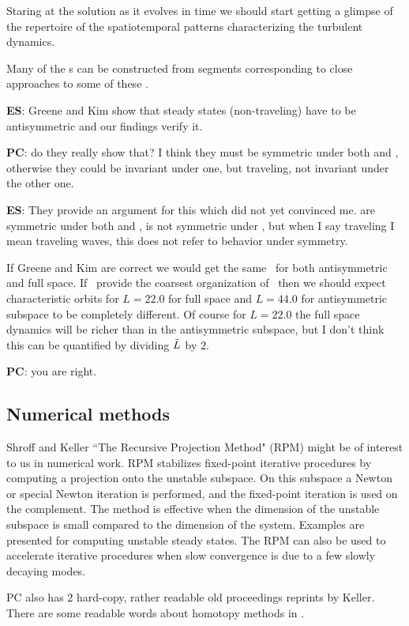 Staring at the solution
 as it evolves in time we should start getting a glimpse of the
 repertoire of the spatiotemporal patterns characterizing
 the turbulent dynamics.

Many of the \rpo s can be constructed from segments corresponding to
close approaches to some of these \eqva.

\textbf{ES}: Greene and Kim show that steady states (non-traveling)
have to be antisymmetric and our findings verify it.

\textbf{PC}: do they really show that? I think they must be symmetric under both
{\Refl} and \Shift, otherwise they could be invariant under one,
but traveling, not invariant under the other one.

\textbf{ES}: They provide an argument for this which did not yet convinced me.
 are symmetric under both {\Refl} and \Shift,  is not
symmetric under \Shift, but when I say traveling I mean traveling waves,
this does not refer to behavior under symmetry.

If Greene and Kim
are correct we would get the same \eqva\ for both
antisymmetric and full space. If \eqva\ provide the coarsest organization
of \statesp\ then we should expect characteristic orbits for $L=22.0$
for full space and $L=44.0$ for antisymmetric subspace to be completely different.
Of course for $L=22.0$ the full space dynamics will be richer than
in the
antisymmetric subspace, but I don't think this can be quantified by
dividing $\tilde{L}$ by $2$.

\textbf{PC}: you are right.


\subsection{Numerical methods}

Shroff and Keller
``The Recursive Projection Method" (RPM)
might be of interest to us in numerical work.
RPM stabilizes fixed-point iterative
procedures by computing a projection onto the unstable subspace.
On this subspace a Newton or special Newton iteration is performed,
and the fixed-point iteration is used on the complement.
The method is effective when the dimension of the unstable subspace
is small compared to the dimension of the system.
Examples are presented for computing unstable steady states.
The RPM can also be used to accelerate iterative procedures when
slow convergence is due to a few slowly decaying modes.

PC also has 2 hard-copy, rather readable
old proceedings reprints by Keller.
There are some readable words about homotopy methods in
.


